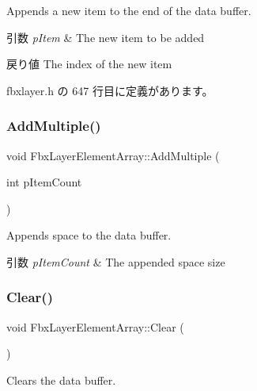 Appends a new item to the end of the data buffer. 
\begin{DoxyParams}{引数}
{\em p\+Item} & The new item to be added \\
\hline
\end{DoxyParams}
\begin{DoxyReturn}{戻り値}
The index of the new item 
\end{DoxyReturn}


 fbxlayer.\+h の 647 行目に定義があります。

\mbox{\label{class_fbx_layer_element_array_a53c4b42b43239dc99f82625b1fb65774}} 
\subsubsection{\texorpdfstring{Add\+Multiple()}{AddMultiple()}}
{\footnotesize\ttfamily void Fbx\+Layer\+Element\+Array\+::\+Add\+Multiple (\begin{DoxyParamCaption}\item[{int}]{p\+Item\+Count }\end{DoxyParamCaption})}

Appends space to the data buffer. 
\begin{DoxyParams}{引数}
{\em p\+Item\+Count} & The appended space size \\
\hline
\end{DoxyParams}
\mbox{\label{class_fbx_layer_element_array_a573662ad442d13623725fef4e19ca207}} 
\subsubsection{\texorpdfstring{Clear()}{Clear()}}
{\footnotesize\ttfamily void Fbx\+Layer\+Element\+Array\+::\+Clear (\begin{DoxyParamCaption}{ }\end{DoxyParamCaption})}



Clears the data buffer. 

\mbox{\label{class_fbx_layer_element_array_a6873dc740572d69cccb83bdbaf7633b6}} 
